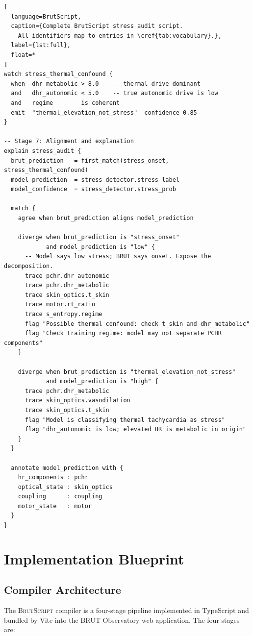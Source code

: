 \documentclass[10pt,twocolumn,a4paper]{article}
\theoremstyle{definition}
\theoremstyle{remark}
\newcommand{\BS}{\textsc{BrutScript}}
\begin{document}
\begin{lstlisting}[
  language=BrutScript,
  caption={Complete BrutScript stress audit script.
    All identifiers map to entries in \cref{tab:vocabulary}.},
  label={lst:full},
  float=*
]
watch stress_thermal_confound {
  when  dhr_metabolic > 8.0    -- thermal drive dominant
  and   dhr_autonomic < 5.0    -- true autonomic drive is low
  and   regime        is coherent
  emit  "thermal_elevation_not_stress"  confidence 0.85
}

-- Stage 7: Alignment and explanation
explain stress_audit {
  brut_prediction   = first_match(stress_onset, stress_thermal_confound)
  model_prediction  = stress_detector.stress_label
  model_confidence  = stress_detector.stress_prob

  match {
    agree when brut_prediction aligns model_prediction

    diverge when brut_prediction is "stress_onset"
            and model_prediction is "low" {
      -- Model says low stress; BRUT says onset. Expose the decomposition.
      trace pchr.dhr_autonomic
      trace pchr.dhr_metabolic
      trace skin_optics.t_skin
      trace motor.rt_ratio
      trace s_entropy.regime
      flag "Possible thermal confound: check t_skin and dhr_metabolic"
      flag "Check training regime: model may not separate PCHR components"
    }

    diverge when brut_prediction is "thermal_elevation_not_stress"
            and model_prediction is "high" {
      trace pchr.dhr_metabolic
      trace skin_optics.vasodilation
      trace skin_optics.t_skin
      flag "Model is classifying thermal tachycardia as stress"
      flag "dhr_autonomic is low; elevated HR is metabolic in origin"
    }
  }

  annotate model_prediction with {
    hr_components : pchr
    optical_state : skin_optics
    coupling      : coupling
    motor_state   : motor
  }
}
\end{lstlisting}

\section{Implementation Blueprint}
\label{sec:implementation}

\subsection{Compiler Architecture}

The \BS{} compiler is a four-stage pipeline implemented in TypeScript
and bundled by Vite into the BRUT Observatory web application.  The
four stages are:
\end{document}

